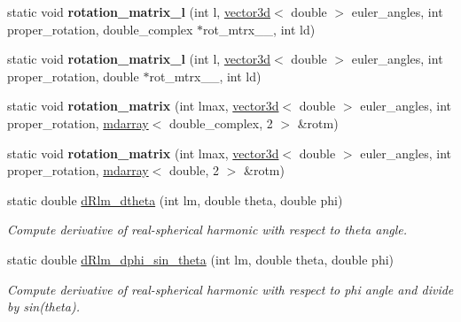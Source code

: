 \begin{DoxyCompactItemize}
\item 
\hypertarget{classsirius_1_1_s_h_t_a4687e65d23736556bab69211af68f36d}{}static void {\bfseries rotation\+\_\+matrix\+\_\+l} (int l, \hyperlink{classgeometry3d_1_1vector3d}{vector3d}$<$ double $>$ euler\+\_\+angles, int proper\+\_\+rotation, double\+\_\+complex $\ast$rot\+\_\+mtrx\+\_\+\+\_\+, int ld)\label{classsirius_1_1_s_h_t_a4687e65d23736556bab69211af68f36d}

\item 
\hypertarget{classsirius_1_1_s_h_t_aedd69ea0be791907dc879706eb55f340}{}static void {\bfseries rotation\+\_\+matrix\+\_\+l} (int l, \hyperlink{classgeometry3d_1_1vector3d}{vector3d}$<$ double $>$ euler\+\_\+angles, int proper\+\_\+rotation, double $\ast$rot\+\_\+mtrx\+\_\+\+\_\+, int ld)\label{classsirius_1_1_s_h_t_aedd69ea0be791907dc879706eb55f340}

\item 
\hypertarget{classsirius_1_1_s_h_t_acb98140d4e977d451a29308120b24bd2}{}static void {\bfseries rotation\+\_\+matrix} (int lmax, \hyperlink{classgeometry3d_1_1vector3d}{vector3d}$<$ double $>$ euler\+\_\+angles, int proper\+\_\+rotation, \hyperlink{classsddk_1_1mdarray}{mdarray}$<$ double\+\_\+complex, 2 $>$ \&rotm)\label{classsirius_1_1_s_h_t_acb98140d4e977d451a29308120b24bd2}

\item 
\hypertarget{classsirius_1_1_s_h_t_a88eecf03897442304cb6b862af1ed82e}{}static void {\bfseries rotation\+\_\+matrix} (int lmax, \hyperlink{classgeometry3d_1_1vector3d}{vector3d}$<$ double $>$ euler\+\_\+angles, int proper\+\_\+rotation, \hyperlink{classsddk_1_1mdarray}{mdarray}$<$ double, 2 $>$ \&rotm)\label{classsirius_1_1_s_h_t_a88eecf03897442304cb6b862af1ed82e}

\item 
static double \hyperlink{classsirius_1_1_s_h_t_a6a7583f9cc91070cb0f58bee7f83f1f4}{d\+Rlm\+\_\+dtheta} (int lm, double theta, double phi)
\begin{DoxyCompactList}\small\item\em Compute derivative of real-\/spherical harmonic with respect to theta angle. \end{DoxyCompactList}\item 
static double \hyperlink{classsirius_1_1_s_h_t_ae71af4119a2427a2344d38b16c5d3e3e}{d\+Rlm\+\_\+dphi\+\_\+sin\+\_\+theta} (int lm, double theta, double phi)
\begin{DoxyCompactList}\small\item\em Compute derivative of real-\/spherical harmonic with respect to phi angle and divide by sin(theta). \end{DoxyCompactList}\end{DoxyCompactItemize}
